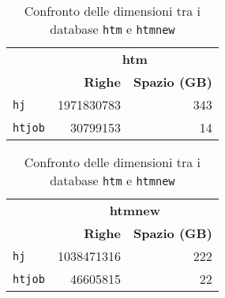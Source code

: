 \begin{table}[!htbp]
    \centering 
    \begin{tabular}{
      lrr
    }
        \toprule 
        & \multicolumn{2}{c}{\textbf{htm}} \\
        \cmidrule{2-3}
        & {\textbf{Righe}} & {\textbf{Spazio (GB)}} \\ 
        \midrule
        \texttt{hj}      & 1971830783 & 343 \\
        \texttt{htjob}   & 30799153 & 14 \\
        \bottomrule
    \end{tabular}
    \hspace*{1cm}
    \begin{tabular}{lrr}
        \toprule
        & \multicolumn{2}{c}{\textbf{htmnew}} \\
        \cmidrule{2-3}
        & {\textbf{Righe}} & {\textbf{Spazio (GB)}} \\
        \midrule
        \texttt{hj}      & 1038471316 & 222 \\
        \texttt{htjob}   & 46605815 & 22 \\
        \bottomrule
    \end{tabular}
    \caption{Confronto delle dimensioni tra i database \texttt{htm} e \texttt{htmnew}}
    \label{table:database_comparison}
\end{table}

